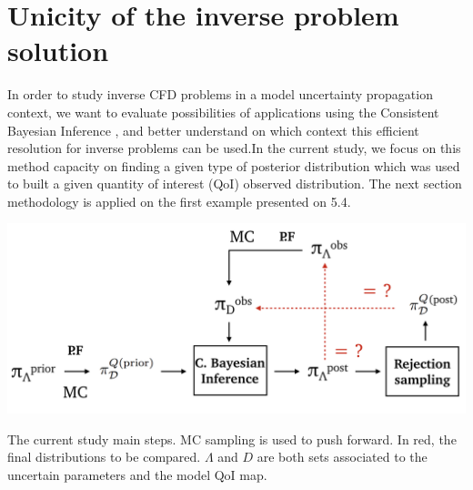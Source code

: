 \documentclass[11pt, a4paper, English]{report}
\begin{document}
\section{Unicity of the inverse problem solution}
\begin{minipage}{0.5\textwidth}
In order to study inverse CFD problems in a model uncertainty propagation context, we want to evaluate possibilities of applications using the Consistent Bayesian Inference \cite{Tim1}, and better understand on which context this efficient resolution for inverse problems can be used.In the current study, we focus on this method capacity on finding a given type of posterior distribution which was used to built a given quantity of interest (QoI) observed distribution. The next section methodology is applied on the first example presented on 5.4.
\end{minipage}
\begin{minipage}{0.49\textwidth}
    \includegraphics[width=\textwidth]{sch2.png}
    \centering
    \caption{The current study main steps. MC sampling is used to push forward. In red, the final distributions to be compared. $\Lambda$ and $D$ are both sets associated to the uncertain parameters and the model QoI map.}
    \label{sch2}

\end{minipage}
\end{document}
